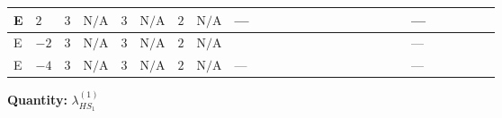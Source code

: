 \documentclass[8pt]{article}
\begin{document}
\begin{landscape}
\begin{longtable}{@{}llcccccc >{\raggedright\arraybackslash}p{0.21\linewidth} >{\raggedright\arraybackslash}p{0.21\linewidth} >{\raggedright\arraybackslash}p{0.21\linewidth}@{}}
\midrule
E & $2$ & $3$ & $\text{N/A}$ & $3$ & $\text{N/A}$ & $2$ & $\text{N/A}$ & --- & \scriptsize\adjustbox{max width=\linewidth}{$\begin{gathered} +3 {g_1}^4\end{gathered}$} & --- \\
\midrule
E & $-2$ & $3$ & $\text{N/A}$ & $3$ & $\text{N/A}$ & $2$ & $\text{N/A}$ & \scriptsize\adjustbox{max width=\linewidth}{$\begin{gathered} +12 {\lambda_{X_{7}}^{(1)}} \left({\lambda_{X_{16}}}\right)^{*} \\ +4 {\lambda_{X_{7}}^{(2)}} \left({\lambda_{X_{16}}}\right)^{*}\end{gathered}$} & \scriptsize\adjustbox{max width=\linewidth}{$\begin{gathered} +3 {g_1}^4\end{gathered}$} & --- \\
\midrule
E & $-4$ & $3$ & $\text{N/A}$ & $3$ & $\text{N/A}$ & $2$ & $\text{N/A}$ & --- & \scriptsize\adjustbox{max width=\linewidth}{$\begin{gathered} +12 {g_1}^4\end{gathered}$} & --- \\
\midrule
\bottomrule
\end{longtable}
\clearpage
\noindent\textbf{Quantity: }$\lambda_{HS_1}^{(1)}$\par\smallskip

\end{landscape}
\end{document}
